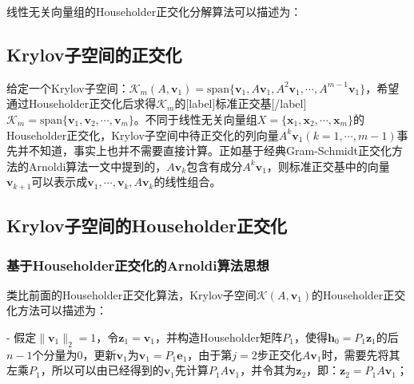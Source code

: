 \documentclass[UTF8,nofonts]{ctexart}
\begin{document}
线性无关向量组的Householder正交化分解算法可以描述为：

\begin{algorithm}[H]
\end{algorithm}

\subsection*{Krylov子空间的正交化}

给定一个Krylov子空间：$\mathcal{K}_m(A,\boldsymbol{v}_1)=\text{span}\{\boldsymbol{v}_1,A\boldsymbol{v}_1,A^2\boldsymbol{v}_1,\cdots,A^{m-1}\boldsymbol{v}_1\}$，希望通过Householder正交化后求得$\mathcal{K}_m$的[label]标准正交基[/label]$\mathcal{K}_m=\text{span}\{\boldsymbol{v}_1,\boldsymbol{v}_2,\cdots,\boldsymbol{v}_m\}$。不同于线性无关向量组$X=\{\boldsymbol{x}_1,\boldsymbol{x}_2,\cdots,\boldsymbol{x}_m\}$的Householder正交化，Krylov子空间中待正交化的列向量$A^k\boldsymbol{v}_1$$(k=1,\cdots,m-1)$事先并不知道，事实上也并不需要直接计算。正如基于经典Gram-Schmidt正交化方法的Arnoldi算法一文中提到的，$A\boldsymbol{v}_k$包含有成分$A^k\boldsymbol{v}_1$，则标准正交基中的向量$\boldsymbol{v}_{k+1}$可以表示成$\boldsymbol{v}_1,\cdots,\boldsymbol{v}_k,A\boldsymbol{v}_k$的线性组合。

\subsection*{Krylov子空间的Householder正交化}

\subsubsection*{基于Householder正交化的Arnoldi算法思想}

类比前面的Householder正交化算法，Krylov子空间$\mathcal{K}(A,\boldsymbol{v}_1)$的Householder正交化方法可以描述为：

- 假定$\|\boldsymbol{v}_1\|_2=1$，令$\boldsymbol{z}_1=\boldsymbol{v}_1$，并构造Householder矩阵$P_1$，使得$\boldsymbol{h}_0=P_1\boldsymbol{z}_1$的后$n-1$个分量为$0$，更新$\boldsymbol{v}_1$为$\boldsymbol{v}_1=P_1\boldsymbol{e}_1$，由于第$j=2$步正交化$A\boldsymbol{v}_1$时，需要先将其左乘$P_1$，所以可以由已经得到的$\boldsymbol{v}_1$先计算$P_1A\boldsymbol{v}_1$，并令其为$\boldsymbol{z}_2$，即：$\boldsymbol{z}_2=P_1A\boldsymbol{v}_1$；
\end{document}

